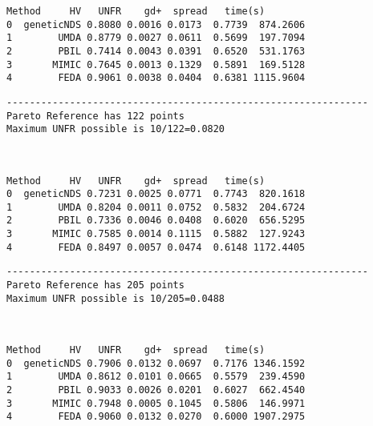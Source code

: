 \documentclass[11pt]{article}
\begin{document}
    
    \begin{Verbatim}[commandchars=\\\{\}]
       Method     HV   UNFR    gd+  spread   time(s)
0  geneticNDS 0.8080 0.0016 0.0173  0.7739  874.2606
1        UMDA 0.8779 0.0027 0.0611  0.5699  197.7094
2        PBIL 0.7414 0.0043 0.0391  0.6520  531.1763
3       MIMIC 0.7645 0.0013 0.1329  0.5891  169.5128
4        FEDA 0.9061 0.0038 0.0404  0.6381 1115.9604
    \end{Verbatim}

    
    \begin{Verbatim}[commandchars=\\\{\}]
---------------------------------------------------------------
Pareto Reference has 122 points
Maximum UNFR possible is 10/122=0.0820
    \end{Verbatim}

    \begin{center}
    \end{center}
    { \hspace*{\fill} \\}
    
    
    \begin{Verbatim}[commandchars=\\\{\}]
       Method     HV   UNFR    gd+  spread   time(s)
0  geneticNDS 0.7231 0.0025 0.0771  0.7743  820.1618
1        UMDA 0.8204 0.0011 0.0752  0.5832  204.6724
2        PBIL 0.7336 0.0046 0.0408  0.6020  656.5295
3       MIMIC 0.7585 0.0014 0.1115  0.5882  127.9243
4        FEDA 0.8497 0.0057 0.0474  0.6148 1172.4405
    \end{Verbatim}

    
    \begin{Verbatim}[commandchars=\\\{\}]
---------------------------------------------------------------
Pareto Reference has 205 points
Maximum UNFR possible is 10/205=0.0488
    \end{Verbatim}

    \begin{center}
    \end{center}
    { \hspace*{\fill} \\}
    
    
    \begin{Verbatim}[commandchars=\\\{\}]
       Method     HV   UNFR    gd+  spread   time(s)
0  geneticNDS 0.7906 0.0132 0.0697  0.7176 1346.1592
1        UMDA 0.8612 0.0101 0.0665  0.5579  239.4590
2        PBIL 0.9033 0.0026 0.0201  0.6027  662.4540
3       MIMIC 0.7948 0.0005 0.1045  0.5806  146.9971
4        FEDA 0.9060 0.0132 0.0270  0.6000 1907.2975
    \end{Verbatim}
\end{document}
